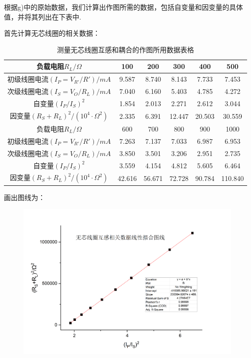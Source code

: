\documentclass[UTF8]{ctexart}
\begin{document}
根据g)中的原始数据，我们计算出作图所需的数据，包括自变量和因变量的具体值，并将其列出在下表中.\par
首先计算无芯线圈的相关数据：
\begin{table}[H]\begin{center}
    \caption{测量无芯线圈互感和耦合的作图所用数据表格}
    \begin{tabular}{|c|c|c|c|c|c|}
        \hline
        负载电阻$R_L/\Omega$&100&200&300&400&500\\
        \hline
        初级线圈电流$(I_P=V_{R'}/R')/mA$&9.587&8.740&8.143&7.733&7.453\\
        \hline
        次级线圈电流$(I_S=V_{O}/R_L)/mA$&7.040&6.160&5.403&4.785&4.272\\
        \hline
        自变量$(I_P/I_S)^2$&1.854&2.013&2.271&2.612&3.044\\
        \hline
        因变量$(R_S+R_L)^2/(10^4\cdot\Omega^2)$&2.335&6.391&12.447&20.503&30.559\\
        \hline
        \hline
        负载电阻$R_L/\Omega$&600&700&800&900&1000\\
        \hline
        初级线圈电流$(I_P=V_{R'}/R')/mA$&7.263&7.137&7.033&6.987&6.953\\
        \hline
        次级线圈电流$(I_S=V_{O}/R_L)/mA$&3.850&3.501&3.206&2.951&2.735\\
        \hline
        自变量$(I_P/I_S)^2$&3.559&4.154&4.812&5.605&6.464\\
        \hline
        因变量$(R_S+R_L)^2/(10^4\cdot\Omega^2)$&42.616&56.671&72.728&90.784&110.840\\
        \hline
    \end{tabular}
\restoregeometry
\end{center}\end{table}
画出图线为：
\begin{figure}[H]\begin{center}
    \includegraphics*[scale = 0.6]{linear1.png}
\end{center}\end{figure}
\end{document}
